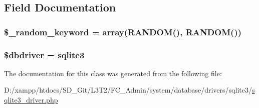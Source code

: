 \subsection{Field Documentation}
\hypertarget{class_c_i___d_b__sqlite3__driver_a10213aa6e05f6d924d3277bb1d2fea00}{}
\subsubsection[{\$\+\_\+random\+\_\+keyword}]{\setlength{\rightskip}{0pt plus 5cm}\$\+\_\+random\+\_\+keyword = array(\textquotesingle{}R\+A\+N\+D\+O\+M()\textquotesingle{}, \textquotesingle{}R\+A\+N\+D\+O\+M()\textquotesingle{})\hspace{0.3cm}{\ttfamily [protected]}}\label{class_c_i___d_b__sqlite3__driver_a10213aa6e05f6d924d3277bb1d2fea00}
\hypertarget{class_c_i___d_b__sqlite3__driver_a0cde2a16322a023d040aa7f725877597}{}
\subsubsection[{\$dbdriver}]{\setlength{\rightskip}{0pt plus 5cm}\$dbdriver = \textquotesingle{}sqlite3\textquotesingle{}}\label{class_c_i___d_b__sqlite3__driver_a0cde2a16322a023d040aa7f725877597}


The documentation for this class was generated from the following file\+:\begin{DoxyCompactItemize}
\item 
D\+:/xampp/htdocs/\+S\+D\+\_\+\+Git/\+L3\+T2/\+F\+C\+\_\+\+Admin/system/database/drivers/sqlite3/\hyperlink{sqlite3__driver_8php}{sqlite3\+\_\+driver.\+php}\end{DoxyCompactItemize}
